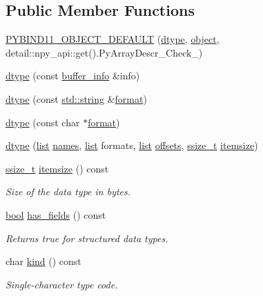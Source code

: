 \subsection*{Public Member Functions}
\begin{DoxyCompactItemize}
\item 
\mbox{\hyperlink{classdtype_a44f6cf870b6db329778cd4f14704ec82}{P\+Y\+B\+I\+N\+D11\+\_\+\+O\+B\+J\+E\+C\+T\+\_\+\+D\+E\+F\+A\+U\+LT}} (\mbox{\hyperlink{classdtype}{dtype}}, \mbox{\hyperlink{classobject}{object}}, detail\+::npy\+\_\+api\+::get().Py\+Array\+Descr\+\_\+\+Check\+\_\+)
\item 
\mbox{\hyperlink{classdtype_a1c32bf51931d64aaa4ee0fbf5b50a3be}{dtype}} (const \mbox{\hyperlink{structbuffer__info}{buffer\+\_\+info}} \&info)
\item 
\mbox{\hyperlink{classdtype_ac63228c0339fa560c343d1e55db89271}{dtype}} (const \mbox{\hyperlink{_s_d_l__opengl__glext_8h_ab4ccfaa8ab0e1afaae94dc96ef52dde1}{std\+::string}} \&\mbox{\hyperlink{_s_d_l__audio_8h_a71a65ffd977afe9c3fef116a5bc9ee27}{format}})
\item 
\mbox{\hyperlink{classdtype_ab5fdb5c230d184d644ee2a8a8b31d021}{dtype}} (const char $\ast$\mbox{\hyperlink{_s_d_l__audio_8h_a71a65ffd977afe9c3fef116a5bc9ee27}{format}})
\item 
\mbox{\hyperlink{classdtype_a8ea3b55fbfef63c1b94da63e74b979c0}{dtype}} (\mbox{\hyperlink{classlist}{list}} \mbox{\hyperlink{_s_d_l__opengl__glext_8h_a339b9616ddcfbc036f0258f8dcdd8902}{names}}, \mbox{\hyperlink{classlist}{list}} formats, \mbox{\hyperlink{classlist}{list}} \mbox{\hyperlink{_s_d_l__opengl__glext_8h_a1b4d6c0d4a1eb8b693aa458f455ed705}{offsets}}, \mbox{\hyperlink{detail_2common_8h_ac430d16fc097b3bf0a7469cfd09decda}{ssize\+\_\+t}} \mbox{\hyperlink{classdtype_a7560e2e9cd37d8dd697755e58442e4cb}{itemsize}})
\item 
\mbox{\hyperlink{detail_2common_8h_ac430d16fc097b3bf0a7469cfd09decda}{ssize\+\_\+t}} \mbox{\hyperlink{classdtype_a7560e2e9cd37d8dd697755e58442e4cb}{itemsize}} () const
\begin{DoxyCompactList}\small\item\em Size of the data type in bytes. \end{DoxyCompactList}\item 
\mbox{\hyperlink{asdl_8h_af6a258d8f3ee5206d682d799316314b1}{bool}} \mbox{\hyperlink{classdtype_ac5eef3474b98106df8be32c6aaa3106b}{has\+\_\+fields}} () const
\begin{DoxyCompactList}\small\item\em Returns true for structured data types. \end{DoxyCompactList}\item 
char \mbox{\hyperlink{classdtype_a18ed8c10011953681620744776e2c984}{kind}} () const
\begin{DoxyCompactList}\small\item\em Single-\/character type code. \end{DoxyCompactList}\end{DoxyCompactItemize}
